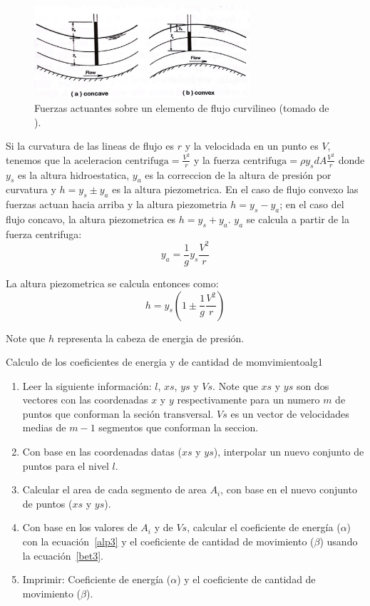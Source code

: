 \documentclass[11pt, oneside]{article}
\begin{document}
\begin{figure}[h]
\centering
\includegraphics[width=8cm]{fig8.jpeg}
\caption{Fuerzas actuantes sobre un elemento de flujo curvilineo (tomado de \cite{Chau}).}
\label{fig8}
\end{figure}

Si la curvatura de las lineas de flujo es $r$ y la velocidada en un punto es  $V$, tenemos que la $\text{aceleracion centrifuga}= \frac{V^2}{r}$ y la $\text{fuerza centrifuga}= \rho y_s dA \frac{V^2}{r}$ donde $y_s$ es la altura hidroestatica, $y_a$ es la correccion de la altura de presi\'on por curvatura y $h = y_s \pm y_a$ es la altura piezometrica. En el caso de flujo convexo las fuerzas actuan hacia arriba y la altura piezometria $h = y_s-y_a$; en el caso del flujo concavo, la altura piezometrica es $h = y_s+y_a$. $y_a$ se calcula a partir de la fuerza centrifuga:
$$
y_a = \frac{1}{g}y_s \frac{V^2}{r}
$$

La altura piezometrica se calcula entonces como:
$$
h = y_s \left( 1 \pm \frac{1}{g} \frac{V^2}{r} \right)
$$

Note que $h$ representa la cabeza de energia de presi\'on. 

\begin{alg}{Calculo de los coeficientes de energia y de cantidad de momvimiento}{alg1}
\begin{enumerate}
\item Leer la siguiente informaci\'on: $l$, $xs$, $ys$ y $Vs$. Note que $xs$ y $ys$ son dos vectores con las coordenadas $x$ y $y$ respectivamente para un numero $m$ de puntos que conforman la seci\'on transversal. $Vs$ es un vector de velocidades medias de $m-1$ segmentos que conforman la seccion.
\item Con base en las coordenadas datas ($xs$ y $ys$), interpolar un nuevo conjunto de puntos para el nivel $l$.   
\item Calcular el area de cada segmento de area $A_i$, con base en el nuevo conjunto de puntos ($xs$ y $ys$).
\item Con base en los valores de $A_i$ y de $Vs$, calcular el coeficiente de energ\'ia ($\alpha$) con la ecuaci\'on~\ref{alp3} y el coeficiente de cantidad de movimiento ($\beta$) usando la ecuaci\'on~\ref{bet3}.
\item Imprimir: Coeficiente de energ\'ia ($\alpha$) y el coeficiente de cantidad de movimiento ($\beta$). 
\end{enumerate}
\end{alg}
\end{document}
